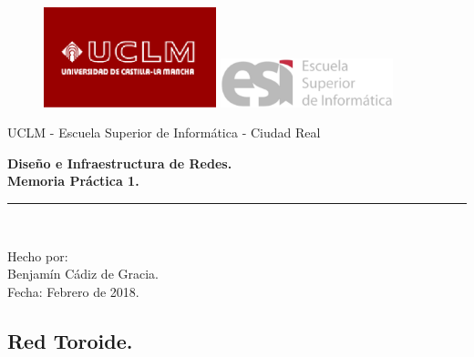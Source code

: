 \documentclass{article}
\begin{document}
\begin{titlepage}
\begin{center}
\vspace*{-1in}
\begin{figure}[htb]
\begin{center}
\includegraphics[width=5cm]{./images/uclm_logo.eps} 
\hspace*{1.5in}
\includegraphics[width=5cm]{./images/esi_logo.eps}
\end{center}
\end{figure}
\end{center}
\begin{center}
UCLM - Escuela Superior de Informática - Ciudad Real\\
\vspace*{0.6in}
\vspace*{0.2in}
\begin{Large}
\textbf{Diseño e Infraestructura de Redes.} \\
\textbf{Memoria Práctica 1.} \\
\end{Large}
\vspace*{0.3in}
\vspace*{0.3in}
\rule{80mm}{0.1mm}\\
\vspace*{0.1in}
\begin{large}
Hecho por: \\
Benjamín Cádiz de Gracia. \\
\vspace*{0.3in}
Fecha: Febrero de 2018.\\
\end{large}
\end{center}

\end{titlepage}
\tableofcontents
\newpage

\begin{center}
\section{ Red Toroide.}
\end{center}
\end{document}
